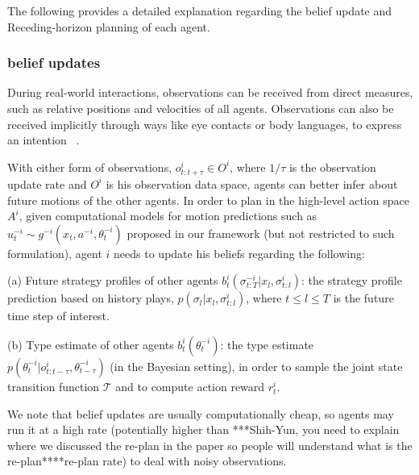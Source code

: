 \documentclass[letterpaper, 10 pt, conference]{ieeeconf}  %
\begin{document}
The following provides a detailed explanation regarding the belief update and 
Receding-horizon planning of each agent.
 
\subsubsection{belief updates}\label{sec:belief_update}
During real-world interactions, observations can be received from direct measures, such as relative positions and velocities of all agents. Observations can also be received implicitly through ways like eye contacts or body languages, to express an intention ~\cite{knepper2017implicit}.

With either form of observations, $o^i_{t:t+\tau} \in O^i$, where $1/\tau$ is the 
observation  
update rate and $O^i$ is his observation data space, agents can better infer about 
future motions of the other agents. In order to plan in the high-level action space $A^i$, given computational models for motion 
predictions such as $u^{-i}_t \sim g^{-i}(x_t,a^{-i},\theta^{-i}_t)$ proposed in our framework (but not restricted to such formulation), agent $i$ needs to update his beliefs regarding the following:

(a) Future strategy profiles of other agents $b^i_t(\sigma^{-i}_{t:T}|x_l,\sigma^i_{t:l})$: 
the strategy profile prediction based on history plays, $p(\sigma_l|x_l,\sigma^i_{t:l})$, 
where $t\leq l\leq T$ is the future time step of 
interest.

(b) Type estimate of other agents $b^i_t(\theta_t^{-i})$: 
the type estimate $p(\theta^{-i}_t|o^i_{t:t-\tau},\theta^{-i}_{t-\tau})$ (in 
the Bayesian setting), in order to sample the joint state transition function 
$\mathcal{T}$ and to compute action reward $r^i_t$.


We note that belief updates are usually computationally cheap, so agents may run it at a high rate (potentially higher than ***Shih-Yun, you need to explain where we discussed the re-plan in the paper so people will understand what is the re-plan****re-plan rate) to deal with noisy 
observations.
 
\end{document}
